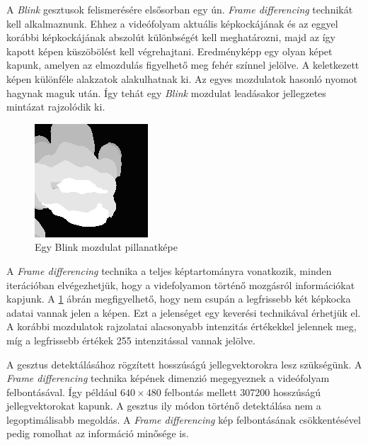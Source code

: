 
A \textit{Blink} gesztusok felismerésére elsősorban egy ún. \textit{Frame differencing} technikát kell alkalmaznunk.
Ehhez a videófolyam aktuális képkockájának és az eggyel korábbi képkockájának abszolút különbségét kell meghatározni, majd az így kapott képen küszöbölést kell végrehajtani. Eredményképp egy olyan képet kapunk, amelyen az elmozdulás figyelhető meg fehér színnel jelölve. A keletkezett képen különféle alakzatok alakulhatnak ki. Az egyes mozdulatok hasonló nyomot hagynak maguk után. Így tehát egy \textit{Blink} mozdulat leadásakor jellegzetes mintázat rajzolódik ki.

\begin{figure}[h]
\centering
\includegraphics[width=4truecm, height=4truecm]{images/Grab_screenshot.png}
\caption{Egy Blink mozdulat pillanatképe}
\label{fig:blink}
\end{figure}

A \textit{Frame differencing} technika a teljes képtartományra vonatkozik, minden iterációban elvégezhetjük, hogy a videfolyamon történő mozgásról információkat kapjunk. A \ref{fig:blink} ábrán megfigyelhető, hogy nem csupán a legfrissebb két képkocka adatai vannak jelen a képen. Ezt a jelenséget egy keverési technikával érhetjük el. A korábbi mozdulatok rajzolatai alacsonyabb intenzitás értékekkel jelennek meg, míg a legfrissebb értékek 255 intenzitással vannak jelölve.

A gesztus detektálásához rögzített hosszúságú jellegvektorokra lesz szükségünk. A \textit{Frame differencing} technika képének dimenzió megegyeznek a videófolyam felbontásával. Így például $640\times480$ felbontás mellett 307200 hosszúságú jellegvektorokat kapunk. A gesztus ily módon történő detektálása nem a legoptimálisabb megoldás. A \textit{Frame differencing} kép felbontásának csökkentésével pedig romolhat az információ minősége is.

